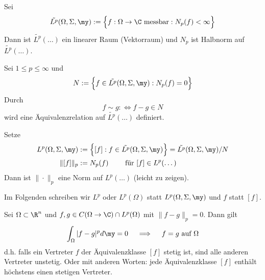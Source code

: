 \documentclass{mycourse}
\begin{document}
\begin{df} \label{2.9}
	Sei 
	\[
		\tilde {L^p} (\Omega, \Sigma, \my)
		:= \Big\{ f : \Omega \to \C \text{ messbar} : N_p(f) < \infty \Big\}
	\]
	Dann ist $\tilde{L^p}(\dots)$ ein linearer Raum (Vektorraum) und $N_p$ ist Halbnorm auf $\tilde{L^p}(\dots)$.
\end{df}

\begin{df} \label{2.10}
	Sei $1 \le p \le \infty$ und
	\begin{align*}
		N := \Big\{ f \in \tilde {L^p}(\Omega, \Sigma, \my) : N_p(f) = 0 \Big\}
	\end{align*}
	Durch
	\[
		f \sim g :\iff f-g \in N
	\]
	wird eine Äquivalenzrelation auf $\tilde{L^p}(\dots)$ definiert.

	Setze
	\begin{align*}
		L^p(\Omega, \Sigma, \my)
		&:= \Big\{ [f] : f \in \tilde{L^p}(\Omega, \Sigma, \my) \Big\}
		= \tilde {L^p} (\Omega, \Sigma, \my) / N \\
		\| [f] \|_p &:= N_p(f) \qquad \text{ für } [f] \in L^p(\dots)
	\end{align*}
	Dann ist $\|\cdot\|_p$ eine Norm auf $L^p(\dots)$ (leicht zu zeigen).

	Im Folgenden schreiben wir $L^p$ oder $L^p(\Omega)$ statt $L^p(\Omega, \Sigma, \my)$ und $f$ statt $[f]$.
\end{df}

\begin{nt} \label{2.11}
	Sei $\Omega \subset \R^n$ und $f,g \in C(\Omega \to \C) \cap L^p(\Omega)$ mit $\|f-g\|_p = 0$.
	Dann gilt
	\begin{align*}
		\int_{\Omega} |f-g|^p d\my = 0
		\quad\implies\quad
		f = g \text{ auf $\Omega$}
	\end{align*}
	d.h. falls ein Vertreter $f$ der Äquivalenzklasse $[f]$ stetig ist, sind alle anderen Vertreter unstetig.
	Oder mit anderen Worten: jede Äquivalenzklasse $[f]$ enthält höchstens einen stetigen Vertreter.
\end{nt}
\end{document}
